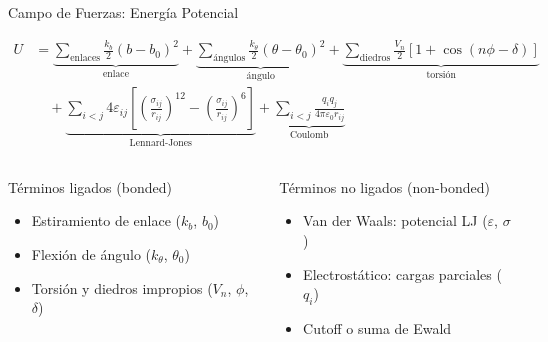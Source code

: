 \documentclass[aspectratio=169, 10pt]{beamer}
\begin{document}
\begin{frame}[shrink=15]{Campo de Fuerzas: Energía Potencial}
\begin{tcolorbox}[formulabox, title={Función de Energía Potencial Total}]
\scriptsize
\begin{align*}
U &= \underbrace{\sum_{\text{enlaces}} \frac{k_b}{2}(b - b_0)^2}_{\text{enlace}}
  + \underbrace{\sum_{\text{ángulos}} \frac{k_\theta}{2}(\theta - \theta_0)^2}_{\text{ángulo}}
  + \underbrace{\sum_{\text{diedros}} \frac{V_n}{2}[1+\cos(n\phi - \delta)]}_{\text{torsión}} \\
  &\quad + \underbrace{\sum_{i<j} 4\varepsilon_{ij}\!\left[\left(\frac{\sigma_{ij}}{r_{ij}}\right)^{12}\!-\!\left(\frac{\sigma_{ij}}{r_{ij}}\right)^{6}\right]}_{\text{Lennard-Jones}}
  + \underbrace{\sum_{i<j} \frac{q_i q_j}{4\pi\varepsilon_0 r_{ij}}}_{\text{Coulomb}}
\end{align*}
\end{tcolorbox}

\vspace{0.1em}
\begin{columns}[T]
\begin{block}{Términos ligados (bonded)}
  \begin{itemize}
    \item Estiramiento de enlace ($k_b$, $b_0$)
    \item Flexión de ángulo ($k_\theta$, $\theta_0$)
    \item Torsión y diedros impropios ($V_n$, $\phi$, $\delta$)
  \end{itemize}
\end{block}

\begin{block}{Términos no ligados (non-bonded)}
  \begin{itemize}
    \item Van der Waals: potencial LJ ($\varepsilon$, $\sigma$)
    \item Electrostático: cargas parciales ($q_i$)
    \item Cutoff o suma de Ewald
  \end{itemize}
\end{block}
\end{columns}
\end{frame}
\end{document}
